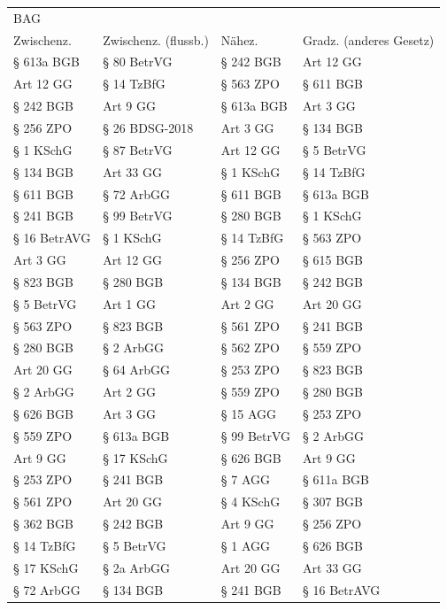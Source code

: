\begin{tabular}{llll}
\toprule
\multicolumn{4}{l}{BAG} \\
  Zwischenz. & Zwischenz. (flussb.) &      Nähez. & Gradz. (anderes Gesetz) \\
\midrule
  § 613a BGB &          § 80 BetrVG &   § 242 BGB &               Art 12 GG \\
   Art 12 GG &           § 14 TzBfG &   § 563 ZPO &               § 611 BGB \\
   § 242 BGB &             Art 9 GG &  § 613a BGB &                Art 3 GG \\
   § 256 ZPO &       § 26 BDSG-2018 &    Art 3 GG &               § 134 BGB \\
   § 1 KSchG &          § 87 BetrVG &   Art 12 GG &              § 5 BetrVG \\
   § 134 BGB &            Art 33 GG &   § 1 KSchG &              § 14 TzBfG \\
   § 611 BGB &           § 72 ArbGG &   § 611 BGB &              § 613a BGB \\
   § 241 BGB &          § 99 BetrVG &   § 280 BGB &               § 1 KSchG \\
§ 16 BetrAVG &            § 1 KSchG &  § 14 TzBfG &               § 563 ZPO \\
    Art 3 GG &            Art 12 GG &   § 256 ZPO &               § 615 BGB \\
   § 823 BGB &            § 280 BGB &   § 134 BGB &               § 242 BGB \\
  § 5 BetrVG &             Art 1 GG &    Art 2 GG &               Art 20 GG \\
   § 563 ZPO &            § 823 BGB &   § 561 ZPO &               § 241 BGB \\
   § 280 BGB &            § 2 ArbGG &   § 562 ZPO &               § 559 ZPO \\
   Art 20 GG &           § 64 ArbGG &   § 253 ZPO &               § 823 BGB \\
   § 2 ArbGG &             Art 2 GG &   § 559 ZPO &               § 280 BGB \\
   § 626 BGB &             Art 3 GG &    § 15 AGG &               § 253 ZPO \\
   § 559 ZPO &           § 613a BGB & § 99 BetrVG &               § 2 ArbGG \\
    Art 9 GG &           § 17 KSchG &   § 626 BGB &                Art 9 GG \\
   § 253 ZPO &            § 241 BGB &     § 7 AGG &              § 611a BGB \\
   § 561 ZPO &            Art 20 GG &   § 4 KSchG &               § 307 BGB \\
   § 362 BGB &            § 242 BGB &    Art 9 GG &               § 256 ZPO \\
  § 14 TzBfG &           § 5 BetrVG &     § 1 AGG &               § 626 BGB \\
  § 17 KSchG &           § 2a ArbGG &   Art 20 GG &               Art 33 GG \\
  § 72 ArbGG &            § 134 BGB &   § 241 BGB &            § 16 BetrAVG \\
\bottomrule
\end{tabular}

